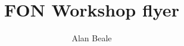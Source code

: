 \documentclass[9pt,
letterpaper]{leaflet}
\title{FON Workshop flyer}
\author{Alan Beale}
\date{}
\begin{document}

\pagebreak

\pagebreak

\pagebreak


\pagebreak

\pagebreak

\end{document}
